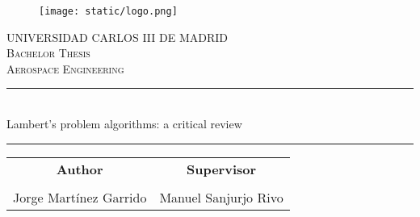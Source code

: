 \begin{titlepage}

  \begin{center}

    \begin{figure}[h]
      \centering
      \texttt{[image: static/logo.png]}
    \end{figure}
    \vspace{1cm}

    \textsc{\Large
      UNIVERSIDAD CARLOS III DE MADRID
    }\\[1cm]

    \textsc{\Large
      Bachelor Thesis
    }\\[0.25cm]
    \textsc{\Large
      Aerospace Engineering
    }\\[1.5cm]

    \noindent\rule{\textwidth}{1pt}
    \\[0.25cm]
    {
    \fontsize{35pt}{35pt}\selectfont
    {
      Lambert's problem algorithms: a critical review
    }
    }
    \noindent\rule{\textwidth}{1pt}

    \vspace{1.5cm}

    \begin{table}[ht]
      \centering
      \begin{tabular}{cc}
        {\ul \Large \textbf{Author}}   & {\ul \Large \textbf{Supervisor}} \\
        \multicolumn{1}{l}{}           & \multicolumn{1}{l}{}             \\
        \large{Jorge Martínez Garrido} & \large{Manuel Sanjurjo Rivo}
      \end{tabular}
    \end{table}

  \end{center}
\end{titlepage}

